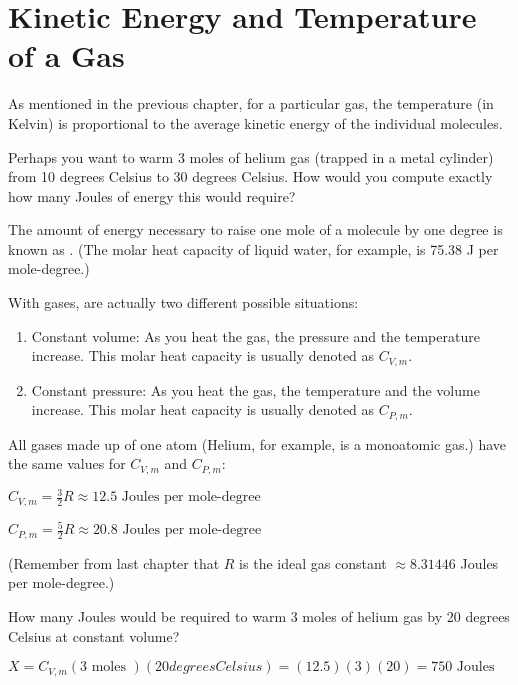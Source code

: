 \chapter{Kinetic Energy and Temperature of a Gas}

As mentioned in the previous chapter,   for a particular gas,  the temperature (in Kelvin) is proportional to the average kinetic energy of the individual molecules. 

Perhaps you want to warm 3 moles of helium gas (trapped in a metal cylinder) from 10 degrees Celsius to 30 degrees Celsius.   
How would you compute exactly how many Joules of energy this would require?

The amount of energy necessary to raise one mole of a molecule by one degree is known as .  
(The molar heat capacity of liquid water, for example, is 75.38 J per mole-degree.)

With gases, are actually two different possible situations:
\begin{enumerate}
\item Constant volume: As you heat the gas,  the pressure and the temperature increase.  This molar heat capacity is usually denoted as $C_{V,m}$.
\item Constant pressure: As you heat the gas,  the temperature and the volume increase.  This molar heat capacity  is usually denoted as $C_{P, m}$.
\end{enumerate}

All gases made up of one atom (Helium, for example, is a monoatomic gas.) have the same values for $C_{V,m}$ and $C_{P,m}$:

$C_{V,m} = \frac{3}{2}R \approx 12.5 \text{ Joules per mole-degree}$

$C_{P,m} = \frac{5}{2}R \approx 20.8  \text{ Joules per mole-degree}$

(Remember from last chapter that $R$ is the ideal gas constant $\approx 8.31446$ Joules per mole-degree.)

\begin{Exercise}[title={Warming Helium},  label=warming_helium]
  
How many Joules would be required to warm 3 moles of helium gas by 20 degrees Celsius at constant volume?

\end{Exercise}
\begin{Answer}[ref=warming_helium]

$X = C_{V,m} (3 \text{ moles }) (20 { degrees Celsius }) = (12.5)(3)(20) = 750 \text{ Joules }$

\end{Answer}

